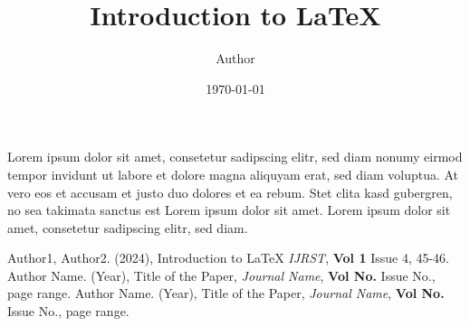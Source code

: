 \documentclass{article}
\begin{document}
	\title{Introduction to LaTeX}
	\author{Author}
	\date{\today}
	\maketitle
	
	Lorem ipsum dolor sit amet,\cite{citation1} consetetur sadipscing elitr, sed diam nonumy eirmod tempor invidunt ut labore et dolore magna aliquyam erat, sed diam voluptua.\cite{citation2} At vero eos et accusam et justo duo dolores et ea rebum. Stet clita kasd gubergren, no sea takimata sanctus est Lorem ipsum dolor sit amet. Lorem ipsum dolor sit amet, consetetur sadipscing elitr, sed diam.\cite{citation3}
	
	\begin{thebibliography}{99}
		 Author1, Author2. (2024), Introduction to LaTeX \emph{IJRST}, \textbf{Vol 1} {Issue 4}, 45-46.
		 Author Name. (Year), Title of the Paper, \emph{Journal Name}, \textbf{Vol No.} {Issue No.}, page range.
		 Author Name. (Year), Title of the Paper, \emph{Journal Name}, \textbf{Vol No.} {Issue No.}, page range.
	\end{thebibliography}
\end{document}
